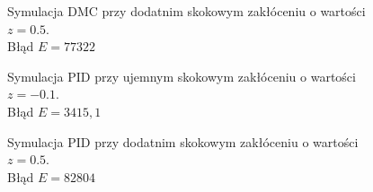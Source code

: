 \begin{figure}[ht]
\centering

\caption{Symulacja DMC przy dodatnim skokowym zakłóceniu o wartości $ z=\num{0,5}$.\\Błąd $ E=\num{77 322} $}
\label{Z6b}
\end{figure}

\begin{figure}[ht]
\centering

\caption{Symulacja PID przy ujemnym skokowym zakłóceniu o wartości $ z=\num{-0,1}$.\\Błąd $ E=3415,1 $ }
\label{Z6c}
\end{figure}

\begin{figure}[ht]
\centering

\caption{Symulacja PID przy dodatnim skokowym zakłóceniu o wartości $ z=\num{0,5}$.\\Błąd $ E=\num{82 804} $}
\label{Z6d}
\end{figure}

